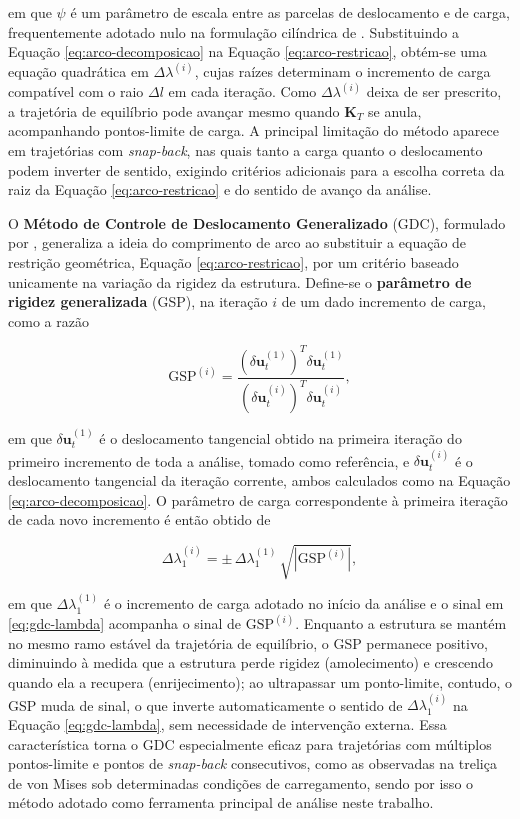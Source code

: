 em que $\psi$ é um parâmetro de escala entre as parcelas de
deslocamento e de carga, frequentemente adotado nulo na formulação
cilíndrica de \citealp{crisfield1981}. Substituindo a Equação
\ref{eq:arco-decomposicao} na Equação \ref{eq:arco-restricao},
obtém-se uma equação quadrática em $\Delta\lambda^{(i)}$, cujas
raízes determinam o incremento de carga compatível com o raio
$\Delta l$ em cada iteração. Como $\Delta\lambda^{(i)}$ deixa de
ser prescrito, a trajetória de equilíbrio pode avançar mesmo
quando $\mathbf{K}_T$ se anula, acompanhando pontos-limite de
carga. A principal limitação do método aparece em trajetórias com
\textit{snap-back}, nas quais tanto a carga quanto o deslocamento
podem inverter de sentido, exigindo critérios adicionais para a
escolha correta da raiz da Equação \ref{eq:arco-restricao} e do
sentido de avanço da análise.

O \textbf{Método de Controle de Deslocamento Generalizado} (GDC),
formulado por \citealp{yang_shieh1990}, generaliza a ideia do
comprimento de arco ao substituir a equação de restrição
geométrica, Equação \ref{eq:arco-restricao}, por um critério
baseado unicamente na variação da rigidez da estrutura. Define-se o
\textbf{parâmetro de rigidez generalizada} (GSP), na iteração $i$
de um dado incremento de carga, como a razão

\begin{equation}
  \text{GSP}^{(i)} =
  \dfrac{
  \left(\delta\mathbf{u}_t^{(1)}\right)^{\!T} \delta\mathbf{u}_t^{(1)}
  }{
  \left(\delta\mathbf{u}_t^{(i)}\right)^{\!T} \delta\mathbf{u}_t^{(i)}
  },
  \label{eq:gsp}
\end{equation}

em que $\delta\mathbf{u}_t^{(1)}$ é o deslocamento tangencial
obtido na primeira iteração do primeiro incremento de toda a
análise, tomado como referência, e $\delta\mathbf{u}_t^{(i)}$ é o
deslocamento tangencial da iteração corrente, ambos calculados
como na Equação \ref{eq:arco-decomposicao}. O parâmetro de carga
correspondente à primeira iteração de cada novo incremento é então
obtido de

\begin{equation}
  \Delta\lambda_1^{(i)} = \pm\, \Delta\lambda_1^{(1)}\,
  \sqrt{\left|\text{GSP}^{(i)}\right|},
  \label{eq:gdc-lambda}
\end{equation}

em que $\Delta\lambda_1^{(1)}$ é o incremento de carga adotado no
início da análise e o sinal em \eqref{eq:gdc-lambda} acompanha o
sinal de $\text{GSP}^{(i)}$. Enquanto a estrutura se mantém no
mesmo ramo estável da trajetória de equilíbrio, o GSP permanece
positivo, diminuindo à medida que a estrutura perde rigidez
(amolecimento) e crescendo quando ela a recupera (enrijecimento);
ao ultrapassar um ponto-limite, contudo, o GSP muda de sinal, o que
inverte automaticamente o sentido de $\Delta\lambda_1^{(i)}$ na
Equação \ref{eq:gdc-lambda}, sem necessidade de intervenção
externa. Essa característica torna o GDC especialmente eficaz para
trajetórias com múltiplos pontos-limite e pontos de
\textit{snap-back} consecutivos, como as observadas na treliça de
von Mises sob determinadas condições de carregamento, sendo por
isso o método adotado como ferramenta principal de análise neste
trabalho.


